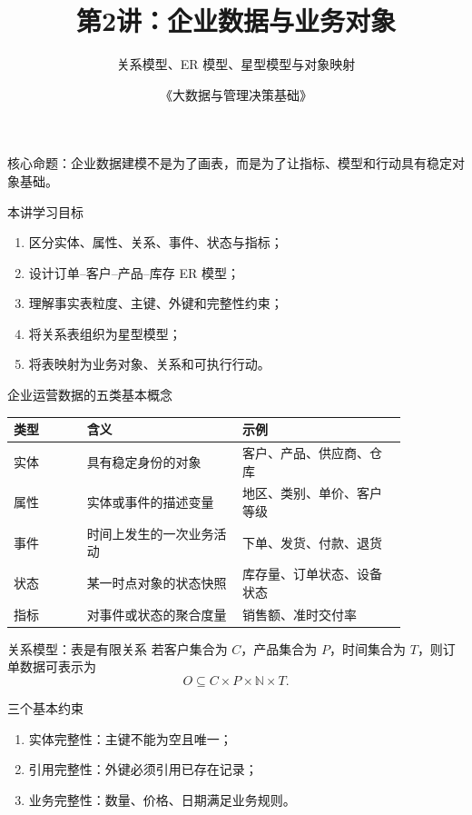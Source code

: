 \documentclass[UTF8,fontset=fandol,aspectratio=169,11pt]{ctexbeamer}
\title[企业数据与业务对象]{第2讲：企业数据与业务对象}
\subtitle{关系模型、ER 模型、星型模型与对象映射}
\author{《大数据与管理决策基础》}
\date{}
\begin{document}
\begin{frame}
  \titlepage
  \begin{center}
    \small 核心命题：企业数据建模不是为了画表，而是为了让指标、模型和行动具有稳定对象基础。
  \end{center}
\end{frame}

\begin{frame}{本讲学习目标}
\begin{enumerate}
  \item 区分实体、属性、关系、事件、状态与指标；
  \item 设计订单--客户--产品--库存 ER 模型；
  \item 理解事实表粒度、主键、外键和完整性约束；
  \item 将关系表组织为星型模型；
  \item 将表映射为业务对象、关系和可执行行动。
\end{enumerate}
\end{frame}

\begin{frame}{企业运营数据的五类基本概念}
\begin{table}
\small
\centering
\begin{tabular}{p{0.16\linewidth}p{0.34\linewidth}p{0.36\linewidth}}
\toprule
类型 & 含义 & 示例\\
\midrule
实体 & 具有稳定身份的对象 & 客户、产品、供应商、仓库\\
属性 & 实体或事件的描述变量 & 地区、类别、单价、客户等级\\
事件 & 时间上发生的一次业务活动 & 下单、发货、付款、退货\\
状态 & 某一时点对象的状态快照 & 库存量、订单状态、设备状态\\
指标 & 对事件或状态的聚合度量 & 销售额、准时交付率\\
\bottomrule
\end{tabular}
\end{table}
\end{frame}

\begin{frame}{关系模型：表是有限关系}
若客户集合为 \(C\)，产品集合为 \(P\)，时间集合为 \(T\)，则订单数据可表示为
\[
O\subseteq C\times P\times \mathbb N\times T.
\]

\begin{block}{三个基本约束}
\begin{enumerate}
  \item 实体完整性：主键不能为空且唯一；
  \item 引用完整性：外键必须引用已存在记录；
  \item 业务完整性：数量、价格、日期满足业务规则。
\end{enumerate}
\end{block}
\end{frame}
\end{document}
